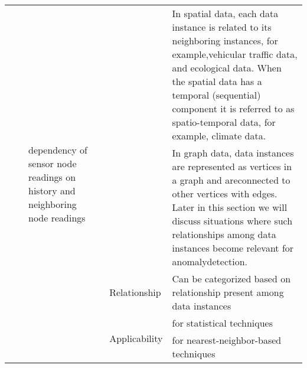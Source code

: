 \begin{table}[]
\begin{tabular}{ llllll }
		\multicolumn{1}{|l}{}                                   &                               & \multicolumn{1}{l|}{\multirow{5}{*}{dependency of sensor node readings on history and neighboring node readings}} &                                       &                                             & \multicolumn{1}{l|}{In spatial data, each data instance is related to its neighboring instances, for example,vehicular traffic data, and ecological data. When the spatial data has a temporal (sequential) component it is referred to as spatio-temporal data, for example, climate data.} \\ \cline{6-6} 
		\multicolumn{1}{|l}{}                                   &                               & \multicolumn{1}{l|}{}                                                                                             &                                       &                                             & \multicolumn{1}{l|}{In graph data, data instances are represented as vertices in a graph and areconnected to other vertices with edges. Later in this section we will discuss situations where such relationships among data instances become relevant for anomalydetection.}                \\ \cline{5-6} 
		\multicolumn{1}{|l}{}                                   &                               & \multicolumn{1}{l|}{}                                                                                             &                                       & Relationship                                & \multicolumn{1}{l|}{Can be categorized based on relationship present among data instances}                                                                                                                                                                                                   \\ \cline{5-6} 
		\multicolumn{1}{|l}{}                                   &                               & \multicolumn{1}{l|}{}                                                                                             &                                       & \multirow{2}{*}{Applicability}              & \multicolumn{1}{l|}{for statistical techniques}                                                                                                                                                                                                                                              \\ \cline{6-6} 
		\multicolumn{1}{|l}{}                                   &                               & \multicolumn{1}{l|}{}                                                                                             &                                       &                                             & \multicolumn{1}{l|}{for nearest-neighbor-based techniques}                                                                                                                                                                                                                                   \\ \hline

\end{tabular}
\end{table}
